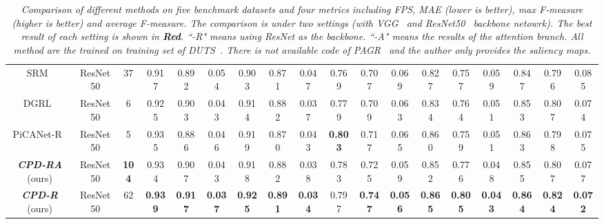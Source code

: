 \documentclass[10pt,twocolumn,letterpaper]{article}
\begin{document}
\begin{table*}[http]
{\begin{tabular}{c|c|c|ccc|ccc|ccc|ccc|ccc}
    \hline
    \hline
    SRM~\cite{2017SRM}   & ResNet50 & 37 & 0.917 & 0.892 & 0.054 & 0.903 & 0.871 & 0.047 & 0.769 & 0.707 & 0.069 & 0.827 & 0.757 & 0.059 & 0.847 & 0.796 & 0.085 \\
    DGRL~\cite{2018DGRL}  & ResNet50 & 6 & 0.925 & 0.903 & 0.043 & 0.914 & 0.882 & 0.037 & 0.779 & 0.709 & 0.063 & 0.834 & 0.764 & 0.051 & 0.853 & 0.807 & 0.074 \\
    PiCANet-R~\cite{2018PiCANet} & ResNet50 & 5 & 0.935 & 0.886 & 0.046 & 0.919 & 0.870 & 0.043 & \textbf{{\color{red}0.803}} & 0.717 & 0.065 & 0.860 & 0.759 & 0.051 & 0.863 & 0.798 & 0.075 \\
    \textbf{\emph{CPD-RA}} (ours) & ResNet50 & \textbf{{\color{red}104}} & 0.934 & 0.907 & 0.043 & 0.918 & 0.882 & 0.038 & 0.783 & 0.725 & 0.059 & 0.852 & 0.776 & 0.048 & 0.855 & 0.807 & 0.077 \\
    \textbf{\emph{CPD-R}} (ours) & ResNet50 & 62 & \textbf{{\color{red}0.939}} & \textbf{{\color{red}0.917}} & \textbf{{\color{red}0.037}} & \textbf{{\color{red}0.925}} & \textbf{{\color{red}0.891}} & \textbf{{\color{red}0.034}} & 0.797 & \textbf{{\color{red}0.747}} & \textbf{{\color{red}0.056}} & \textbf{{\color{red}0.865}} & \textbf{{\color{red}0.805}} & \textbf{{\color{red}0.043}} & \textbf{{\color{red}0.864}} & \textbf{{\color{red}0.824}} & \textbf{{\color{red}0.072}} \\
    \hline
    \end{tabular}}
  \caption{\emph{Comparison of different methods on five benchmark datasets and four metrics including FPS, MAE (lower is better), max F-measure (higher is better) and average F-measure. The comparison is under two settings (with VGG~\cite{2014VGG} and ResNet50~\cite{2016ResNet} backbone netowrk). The best result of each setting is shown in \textbf{{\color{red}Red}}. ``-R" means using ResNet as the backbone. ``-A" means the results of the attention branch. All method are the trained on training set of DUTS~\cite{Dataset-DUTS}. There is not available code of PAGR~\cite{2018PAGR} and the author only provides the saliency maps.}}
  \label{All_Results}\end{table*}
\end{document}
